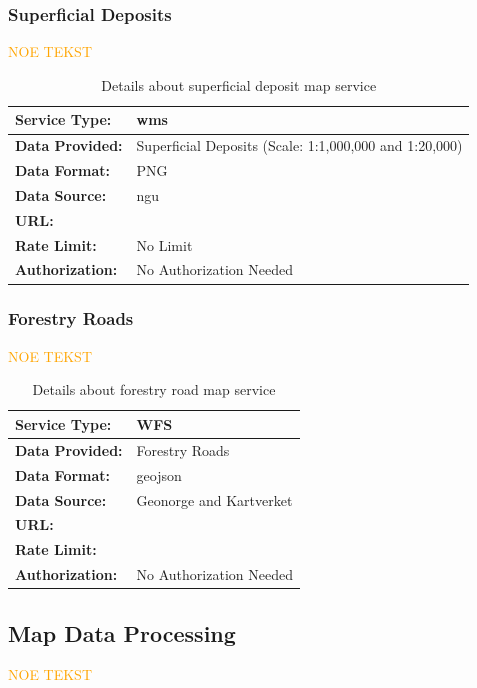 \subsubsection*{Superficial Deposits}

\textcolor{orange}{NOE TEKST}
\begin{table}[h]
    \centering
    \begin{tabularx}{\linewidth}{|l|X|}
        \hline
        \textbf{Service Type:} & \Gls{wms} \\
        \hline
        \textbf{Data Provided:} & Superficial Deposits (Scale: 1:1,000,000 and 1:20,000) \\
        \hline
        \textbf{Data Format:} & PNG \\
        \hline
        \textbf{Data Source:} & \acrshort{ngu} \\
        \hline
        \textbf{URL:} &  \\
        \hline
        \textbf{Rate Limit:} & No Limit \\
        \hline
        \textbf{Authorization:} & No Authorization Needed\\
        \hline
    \end{tabularx}
    \caption{Details about superficial deposit map service}
    \label{tab:superficial_deposit_map_service}
\end{table}

\subsubsection*{Forestry Roads}

\textcolor{orange}{NOE TEKST}
\begin{table}[h]
    \centering
    \begin{tabularx}{\linewidth}{|l|X|}
        \hline
        \textbf{Service Type:} & WFS \\
        \hline
        \textbf{Data Provided:} & Forestry Roads \\
        \hline
        \textbf{Data Format:} & \Gls{geojson} \\
        \hline
        \textbf{Data Source:} & Geonorge and Kartverket \\
        \hline
        \textbf{URL:} &  \\
        \hline
        \textbf{Rate Limit:} &  \\
        \hline
        \textbf{Authorization:} & No Authorization Needed \\
        \hline
    \end{tabularx}
    \caption{Details about forestry road map service}
    \label{tab:forestry_road_map_service}
\end{table}


\subsection{Map Data Processing}

\textcolor{orange}{NOE TEKST}

